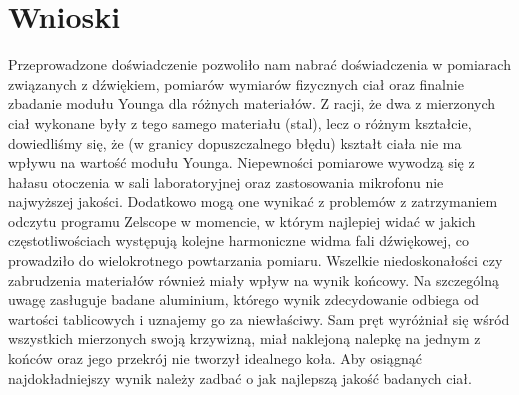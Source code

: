 \documentclass[a4paper,12pts]{article}
\begin{document}
	\section{Wnioski}
		Przeprowadzone doświadczenie pozwoliło nam nabrać doświadczenia w pomiarach związanych z dźwiękiem, pomiarów wymiarów fizycznych ciał oraz finalnie zbadanie modułu Younga dla różnych materiałów. Z racji, że dwa z mierzonych ciał wykonane były z tego samego materiału (stal), lecz o różnym kształcie, dowiedliśmy się, że (w granicy dopuszczalnego błędu) kształt ciała nie ma wpływu na wartość modułu Younga. Niepewności pomiarowe wywodzą się z hałasu otoczenia w sali laboratoryjnej oraz zastosowania mikrofonu nie najwyższej jakości. Dodatkowo mogą one wynikać z problemów z zatrzymaniem odczytu programu Zelscope w momencie, w którym najlepiej widać w jakich częstotliwościach występują kolejne harmoniczne widma fali dźwiękowej, co prowadziło do wielokrotnego powtarzania pomiaru. Wszelkie niedoskonałości czy zabrudzenia materiałów również miały wpływ na wynik końcowy. Na szczególną uwagę zasługuje badane aluminium, którego wynik zdecydowanie odbiega od wartości tablicowych i uznajemy go za niewłaściwy. Sam pręt wyróżniał się wśród wszystkich mierzonych swoją krzywizną, miał naklejoną nalepkę na jednym z końców oraz jego przekrój nie tworzył idealnego koła. Aby osiągnąć najdokładniejszy wynik należy zadbać o jak najlepszą jakość badanych ciał.
	
\end{document}
